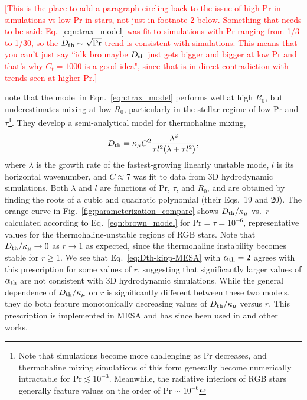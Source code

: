 \textcolor{red}{[This is the place to add a paragraph circling back to the issue of high Pr in simulations vs low Pr in stars, not just in footnote 2 below. Something that needs to be said: Eq.~\eqref{eqn:trax_model} was fit to simulations with Pr ranging from 1/3 to 1/30, so the $D_\mathrm{th} \sim \sqrt{\mathrm{Pr}}$ trend is consistent with simulations. This means that you can't just say ``idk bro maybe $D_\mathrm{th}$ just gets bigger and bigger at low Pr and that's why $C_t = 1000$ is a good idea", since that is in direct contradiction with trends seen at higher Pr.]}

\citet{brown_etal_2013} note that the model in Eqn.~\eqref{eqn:trax_model} performs well at high $R_0$, but underestimates mixing at low $R_0$, particularly in the stellar regime of low Pr and $\tau$\footnote{Note that simulations become more challenging as $\mathrm{Pr}$ decreases, and thermohaline mixing simulations of this form generally become numerically intractable for $\mathrm{Pr} \lesssim 10^{-3}$. Meanwhile, the radiative interiors of RGB stars generally feature values on the order of $\mathrm{Pr} \sim 10^{-6}$}.
They develop a semi-analytical model for thermohaline mixing,
\begin{equation}
    \Dth = \kappa_{\mu}C^2\frac{\lambda^2}{\tau l^2(\lambda + \tau l^2)},
    \label{eqn:brown_model}
\end{equation}
where $\lambda$ is the growth rate of the fastest-growing linearly unstable mode, $l$ is its horizontal wavenumber, and $C \approx 7$ was fit to data from 3D hydrodynamic simulations.
Both $\lambda$ and $l$ are functions of $\mathrm{Pr}$, $\tau$, and $R_0$, and are obtained by finding the roots of a cubic and quadratic polynomial (their Eqs.~19 and 20).
The orange curve in Fig.~\ref{fig:parameterization_compare} shows $D_\mathrm{th}/\kappa_\mu$ vs.~$r$ calculated according to Eq.~\eqref{eqn:brown_model} for $\mathrm{Pr} = \tau = 10^{-6}$, representative values for the thermohaline-unstable regions of RGB stars. 
Note that $D_\mathrm{th}/\kappa_\mu \to 0$ as $r \to 1$ as expected, since the thermohaline instability becomes stable for $r \geq 1$.
We see that Eq.~\eqref{eq:Dth-kipp-MESA} with $\alpha_{\rm{th}} = 2$ agrees with this prescription for some values of $r$, suggesting that significantly larger values of $\alpha_{\rm{th}}$ are not consistent with 3D hydrodynamic simulations. 
While the general dependence of $D_\mathrm{th}/\kappa_\mu$ on $r$ is significantly different between these two models, they do both feature monotonically decreasing values of $D_\mathrm{th}/\kappa_\mu$ versus $r$. 
This prescription is implemented in MESA and has since been used in \citet{bauer_bildsten_2019} and other works. %

